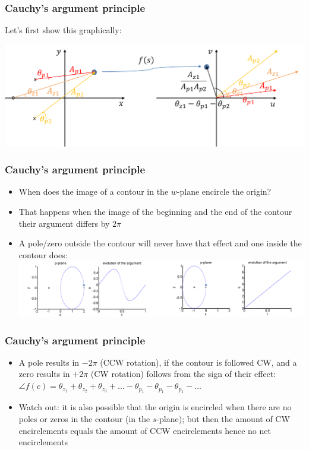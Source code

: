 \begin{frame}
\frametitle{Cauchy’s argument principle}
Let’s first show this graphically:

\includegraphics[width= 0.9\linewidth]{Afbeelding4} 
\end{frame}

\begin{frame}
\frametitle{Cauchy’s argument principle}
\begin{itemize}
\item When does the image of a contour in the $w$-plane encircle the origin?
\item That happens when the image of the beginning and the end of the contour their argument differs by $2\pi$
\item A pole/zero outside the contour will never have that effect and one inside the contour does:
\\
\includegraphics[width=0.95\linewidth]{Afbeelding5}
\end{itemize}
\end{frame}

\begin{frame}
\frametitle{Cauchy’s argument principle}
\begin{itemize}
\item A pole results in $-2\pi$ (CCW rotation), if the contour is followed CW, and a zero results in $+2\pi$ (CW rotation) follows from the sign of their effect: \\$ \angle f(c) = \theta_{z_1} + \theta_{z_2}+\theta_{z_3}+...-\theta_{p_1} - \theta_{p_1} - \theta_{p_1}-... $ 
\item Watch out: it is also possible that the origin is encircled when there are no poles or zeros in the contour (in the $s$-plane); but then the amount of CW encirclements equals the amount of CCW encirclements hence no net encirclements
\end{itemize}
\end{frame}

